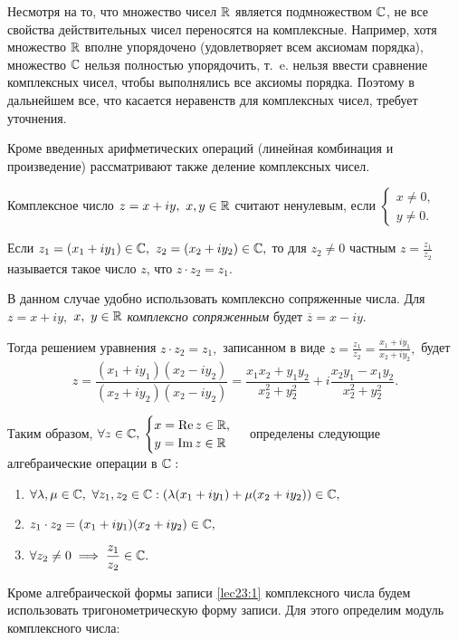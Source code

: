 \documentclass[../../main.tex]{subfiles}
\begin{document}
	Несмотря на то, что множество чисел $\mathbb{R}$ является подмножеством $\mathbb{C}$, не все
	свойства действительных чисел переносятся на комплексные. Например, хотя
	множество $\mathbb{R}$ вполне упорядочено (удовлетворяет всем аксиомам порядка),
	множество $\mathbb{C}$ нельзя полностью упорядочить, т.~e. нельзя ввести сравнение
	комплексных чисел, чтобы выполнялись все аксиомы порядка. Поэтому в 
	дальнейшем все, что касается неравенств для комплексных чисел, требует
	уточнения.
	
	Кроме введенных арифметических операций (линейная комбинация и произведение)
	рассматривают также деление комплексных чисел.
	
	Комплексное число $z = x + iy,\ x, y\in\mathbb{R}$ считают ненулевым, если 
	$\left\{
	\begin{gathered} 
		x \neq  0, \\
		y \neq  0. 
	\end{gathered} \right.$
	
	Если $z_1 = (x_1 + iy_1)\in \mathbb{C},\ z_2 = (x_2 + iy_2)\in\mathbb{C},$ то для 
	$z_2 \neq 0$ частным $z = \frac{z_1}{z_2}$ называется такое число $z$,
	что $z\cdot z_2 = z_1.$
	
	В данном случае удобно использовать комплексно сопряженные числа. Для
	$z = x +iy,$ $x,\ y\in\mathbb{R}$ \emph{комплексно сопряженным} будет 
	$\overline{z} = x - iy.$
	
	Тогда решением уравнения $z\cdot z_2 = z_1,$ записанном в виде 
	$z = \frac{z_1}{z_2} = \frac{x_1 + iy_1}{x_2 + iy_2},$ будет
	\[z = \frac{(x_1 + iy_1)(x_2 - iy_2)}{(x_2 + iy_2)(x_2 - iy_2)} =
	\frac{x_1x_2+y_1y_2}{x_2^2 + y_2^2} + i  
	\frac{x_2y_1-x_1y_2}{x_2^2 + y_2^2}.\]
	
	Таким образом, $\forall z\in \mathbb{C},$ 
	$\begin{cases} 
	x = \operatorname{Re} z \in \mathbb{R},\\
	 y = \operatorname{Im} z \in \mathbb{R}
	\end{cases}$ определены следующие алгебраические операции в $\mathbb{C}:$
	\begin{enumerate}
		\item $\forall \lambda, \mu\in\mathbb{C},\ \forall z_1, z_2\in\mathbb{C}:
		(\lambda(x_1+iy_1)+\mu(x_2+iy_2)) \in\mathbb{C},$
		\item $z_1\cdot z_2 = (x_1+iy_1)(x_2+iy_2) \in\mathbb{C},$
		\item $\forall z_2 \neq 0 \implies \dfrac{z_1}{z_2}
		\in \mathbb{C}.$
	\end{enumerate}
	
	Кроме алгебраической формы записи \eqref{lec23:1} комплексного числа будем
	использовать тригонометрическую форму записи. Для этого определим модуль 
	комплексного числа:
	
\end{document}
